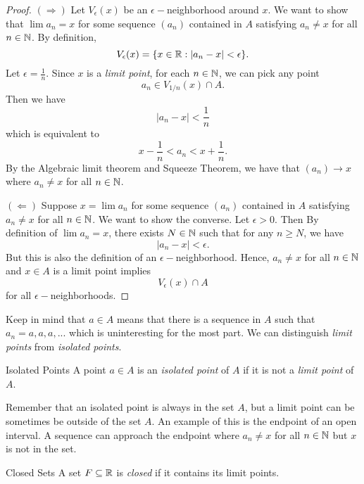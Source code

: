 \begin{proof}
    \( (\Rightarrow) \) Let \( V_{\epsilon }(x) \) be an \( \epsilon-\)neighborhood around \( x \). We want to show that \( \lim a_n = x  \) for some sequence \( (a_n) \) contained in \( A  \) satisfying \( a_n \neq x  \) for all \( n \in \mathbb{N}  \). By definition, 
    \[ V_{\epsilon}(x) = \{ x \in \mathbb{R} : | a_n - x  | < \epsilon  \}.  \]
    Let \( \epsilon = \frac{ 1 }{ n }  \). Since \( x  \) is a \textit{limit point}, for each \( n \in \mathbb{N}  \), we can pick any point 
    \[ a_n \in V_{1/n}(x) \cap A. \]Then we have 
    \[  | a_n - x | < \frac{ 1 }{ n }  \]
    which is equivalent to 
    \[ x - \frac{ 1 }{ n } < a_n < x + \frac{ 1 }{ n }. \] 
    By the Algebraic limit theorem and Squeeze Theorem, we have that \( (a_n) \to x  \) where \( a_n \neq x  \) for all \( n \in \mathbb{N}  \). 

    \( (\Leftarrow) \) Suppose \( x = \lim a_n \) for some sequence \( (a_n) \) contained in \( A \) satisfying \( a_n \neq x  \) for all \( n \in \mathbb{N}  \). We want to show the converse. Let \( \epsilon > 0  \). Then By definition of \( \lim a_n = x  \), there exists \( N \in \mathbb{N}  \) such that for any \( n \geq N \), we have  
    \[  | a_n - x  | < \epsilon.  \]
    But this is also the definition of an \( \epsilon-\)neighborhood. Hence, \( a_n \neq x  \) for all \( n \in \mathbb{N}  \) and \( x \in A  \) is a limit point implies 
    \[ V_{\epsilon }(x) \cap A \]
    for all \( \epsilon- \)neighborhoods. 
\end{proof}

Keep in mind that \( a \in A  \) means that there is a sequence in \( A  \) such that \( a_n = {a,a,a, ...} \) which is uninteresting for the most part. We can distinguish \textit{limit points} from \textit{isolated points}.  

\begin{definition}{Isolated Points}{}
A point \( a \in A  \) is an \textit{isolated point} of \( A \) if it is not a \textit{limit point} of \( A \).  
\end{definition}

Remember that an isolated point is always in the set \( A  \), but a limit point can be sometimes be outside of the set \( A \). An example of this is the endpoint of an open interval. A sequence can approach the endpoint where \( a_n \neq x  \) for all \( n \in \mathbb{N}  \) but \( x  \) is not in the set.  

\begin{definition}{Closed Sets}{}
A set \( F \subseteq \mathbb{R}  \) is \textit{closed} if it contains its limit points. 
\end{definition}

